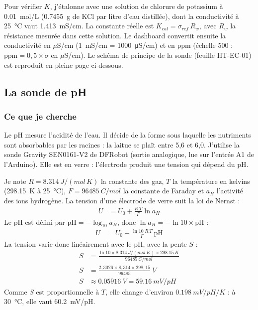 Pour vérifier $K$, j'étalonne avec une solution de chlorure de potassium à \qty{0,01}{mol/L} (\qty{0,7455}{g} de KCl par litre d'eau distillée), dont la conductivité à \qty{25}{\celsius} vaut \qty{1,413}{mS/cm}. La constante réelle est $K_{cal} = \sigma_{ref}\,R_w$, avec $R_w$ la résistance mesurée dans cette solution. Le dashboard convertit ensuite la conductivité en $\mu$S/cm (\qty{1}{mS/cm} = \qty{1000}{\micro S/cm}) et en ppm (échelle 500 : $\mathrm{ppm} = 0{,}5 \times \sigma$ en $\mu$S/cm). Le schéma de principe de la sonde (feuille HT-EC-01) est reproduit en pleine page ci-dessous.


\subsection{La sonde de pH}

\subsubsection*{Ce que je cherche}

Le pH mesure l'acidité de l'eau. Il décide de la forme sous laquelle les nutriments sont absorbables par les racines : la laitue se plaît entre 5,6 et 6,0. J'utilise la sonde Gravity SEN0161-V2 de DFRobot (sortie analogique, lue sur l'entrée A1 de l'Arduino). Elle est en verre : l'électrode produit une tension qui dépend du pH.

\begin{demonstration}
Je note $R = \qty{8,314}{J/(mol\,K)}$ la constante des gaz, $T$ la température en kelvins (\qty{298,15}{K} à \qty{25}{\celsius}), $F = \qty{96485}{C/mol}$ la constante de Faraday et $a_{H}$ l'activité des ions hydrogène. La tension d'une électrode de verre suit la loi de Nernst :
\begin{align*}
U &= U_0 + \frac{R\,T}{F}\ln a_{H}
\end{align*}
Le pH est défini par $\mathrm{pH} = -\log_{10} a_{H}$, donc $\ln a_H = -\ln 10 \times \mathrm{pH}$ :
\begin{align*}
U &= U_0 - \frac{\ln 10\; R\,T}{F}\,\mathrm{pH}
\end{align*}
La tension varie donc linéairement avec le pH, avec la pente $S$ :
\begin{align*}
S &= \frac{\ln 10 \times \qty{8,314}{J/(mol\,K)} \times \qty{298,15}{K}}{\qty{96485}{C/mol}}\\
S &= \frac{2{,}3026 \times 8{,}314 \times 298{,}15}{96485}\ \unit{V}\\
S &\approx \qty{0,05916}{V} = \qty{59,16}{mV/pH}
\end{align*}
Comme $S$ est proportionnelle à $T$, elle change d'environ $\qty{0,198}{mV/pH/K}$ : à \qty{30}{\celsius}, elle vaut \qty{60,2}{mV/pH}.
\end{demonstration}

